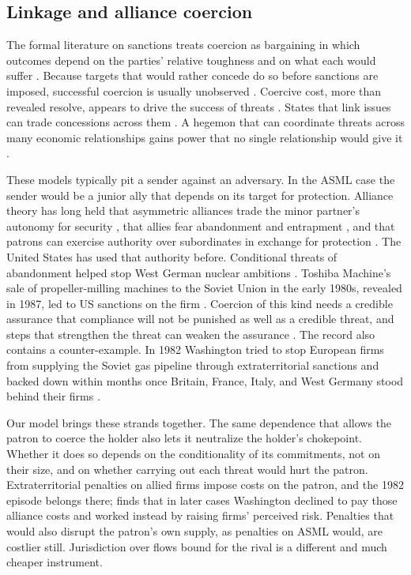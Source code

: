 \subsection{Linkage and alliance coercion}

The formal literature on sanctions treats coercion as bargaining in which outcomes depend on the parties' relative toughness and on what each would suffer \citep{eaton1992sanctions}. Because targets that would rather concede do so before sanctions are imposed, successful coercion is usually unobserved \citep{drezner2003hidden, lacy2004theory}. Coercive cost, more than revealed resolve, appears to drive the success of threats \citep{whang2013coercion}. States that link issues can trade concessions across them \citep{lacy2004theory, poast2012issue}. A hegemon that can coordinate threats across many economic relationships gains power that no single relationship would give it \citep{clayton2026framework}.

These models typically pit a sender against an adversary. In the ASML case the sender would be a junior ally that depends on its target for protection. Alliance theory has long held that asymmetric alliances trade the minor partner's autonomy for security \citep{morrow1991alliances}, that allies fear abandonment and entrapment \citep{snyder1984security}, and that patrons can exercise authority over subordinates in exchange for protection \citep{lake2009hierarchy}. The United States has used that authority before. Conditional threats of abandonment helped stop West German nuclear ambitions \citep{gerzhoy2015alliance}. Toshiba Machine's sale of propeller-milling machines to the Soviet Union in the early 1980s, revealed in 1987, led to US sanctions on the firm \citep[302--303]{mastanduno1992economic}. Coercion of this kind needs a credible assurance that compliance will not be punished as well as a credible threat, and steps that strengthen the threat can weaken the assurance \citep{pauly2024damned, cebul2021coercion}. The record also contains a counter-example. In 1982 Washington tried to stop European firms from supplying the Soviet gas pipeline through extraterritorial sanctions and backed down within months once Britain, France, Italy, and West Germany stood behind their firms \citep{jentleson1986pipeline, rodman1995sanctions}.

Our model brings these strands together. The same dependence that allows the patron to coerce the holder also lets it neutralize the holder's chokepoint. Whether it does so depends on the conditionality of its commitments, not on their size, and on whether carrying out each threat would hurt the patron. Extraterritorial penalties on allied firms impose costs on the patron, and the 1982 episode belongs there; \citet{rodman1995sanctions} finds that in later cases Washington declined to pay those alliance costs and worked instead by raising firms' perceived risk. Penalties that would also disrupt the patron's own supply, as penalties on ASML would, are costlier still. Jurisdiction over flows bound for the rival is a different and much cheaper instrument.

